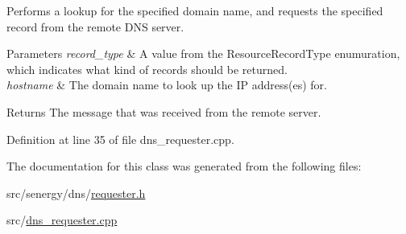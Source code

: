 Performs a lookup for the specified domain name, and requests the specified record from the remote D\-N\-S server. 


\begin{DoxyParams}{Parameters}
{\em record\-\_\-type} & A value from the Resource\-Record\-Type enumuration, which indicates what kind of records should be returned. \\
\hline
{\em hostname} & The domain name to look up the I\-P address(es) for.\\
\hline
\end{DoxyParams}
\begin{DoxyReturn}{Returns}
The message that was received from the remote server. 
\end{DoxyReturn}


Definition at line 35 of file dns\-\_\-requester.\-cpp.



The documentation for this class was generated from the following files\-:\begin{DoxyCompactItemize}
\item 
src/senergy/dns/\hyperlink{requester_8h}{requester.\-h}\item 
src/\hyperlink{dns__requester_8cpp}{dns\-\_\-requester.\-cpp}\end{DoxyCompactItemize}
